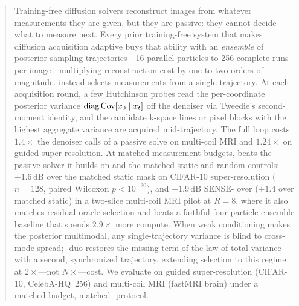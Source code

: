 \begin{abstract}
Training-free diffusion solvers reconstruct images from whatever measurements they are given, but
they are passive: they cannot decide what to measure next. Every prior training-free system that
makes diffusion acquisition adaptive buys that ability with an \emph{ensemble} of
posterior-sampling trajectories---16 parallel particles to 256 complete runs per
image---multiplying reconstruction cost by one to two orders of magnitude. \pvas{} instead selects
measurements from a single trajectory. At each acquisition round, a few Hutchinson probes read the
per-coordinate posterior variance $\mathrm{diag}\,\mathrm{Cov}[\xz \mid \xt]$ off the denoiser via
Tweedie's second-moment identity, and the candidate k-space lines or pixel blocks with the highest
aggregate variance are acquired mid-trajectory. The full loop costs $1.4\times$ the denoiser calls
of a passive solve on multi-coil MRI and $1.24\times$ on guided super-resolution. At matched
measurement budgets, \pvas{} beats the passive solver it builds on and the matched static and
random controls: $+1.6$\,dB \psnrm{} over the matched static mask on CIFAR-10 super-resolution
($n{=}128$, paired Wilcoxon $p<10^{-20}$), and $+1.9$\,dB SENSE-\psnrm{} over \pigdm{} ($+1.4$ over
matched static) in a two-slice multi-coil MRI pilot at $R{=}8$, where it also matches
residual-oracle selection and beats a faithful four-particle ensemble baseline that spends
$2.9\times$ more compute. When weak conditioning makes the posterior multimodal, any
single-trajectory variance is blind to cross-mode spread; \pvas{}-duo restores the missing term of
the law of total variance with a second, synchronized trajectory, extending selection to this
regime at $2\times$---not $N\times$---cost. We evaluate on guided super-resolution (CIFAR-10,
CelebA-HQ~256) and multi-coil MRI (fastMRI brain) under a matched-budget, matched-\nfe{} protocol.
\end{abstract}
